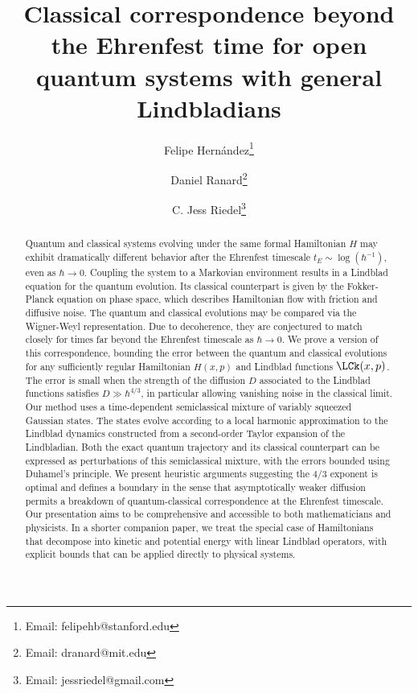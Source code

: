 \documentclass{article}
\numberwithin{equation}{section}
\begin{document}
\title{Classical correspondence beyond the Ehrenfest time for open quantum systems with general Lindbladians}







\renewcommand\Affilfont{\small}

\author[1,2]{Felipe Hernández\footnote{Email: felipehb@stanford.edu}}
\author[3]{Daniel Ranard\footnote{Email: dranard@mit.edu}}
\author[2]{C. Jess Riedel\footnote{Email: jessriedel@gmail.com}}
\date{}
\maketitle
\begin{abstract}


Quantum and classical systems evolving under the same formal Hamiltonian $H$ may exhibit dramatically different behavior after the Ehrenfest timescale  $t_E \sim \log(\hbar^{-1})$, even as $\hbar \to 0$. 
Coupling the system to a Markovian environment results in a Lindblad equation for the quantum evolution.
Its classical counterpart is given by the Fokker-Planck equation on phase space, which describes Hamiltonian flow with friction and diffusive noise. The quantum and classical evolutions may be compared via the Wigner-Weyl representation. Due to decoherence, they are conjectured to match closely for times far beyond the Ehrenfest timescale as $\hbar \to 0$. We prove a version of this correspondence, bounding the error between the quantum and classical evolutions for any sufficiently regular Hamiltonian $H(x,p)$ and Lindblad functions $\LCk(x,p)$.  The error is small when the strength of the diffusion $D$ associated to the Lindblad functions satisfies $D \gg \hbar^{4/3}$, in particular allowing vanishing noise in the classical limit. 
Our method uses a time-dependent semiclassical mixture of variably squeezed Gaussian states.  
The states evolve according to a local harmonic approximation to the Lindblad dynamics constructed from a second-order Taylor expansion of the Lindbladian.
Both the exact quantum trajectory and its classical counterpart can be expressed as perturbations of this semiclassical mixture, with the errors bounded using Duhamel's principle.
We present heuristic arguments suggesting the $4/3$ exponent is optimal and defines a boundary in the sense that asymptotically weaker diffusion permits a breakdown of quantum-classical correspondence at the Ehrenfest timescale.  Our presentation aims to be comprehensive and accessible to both mathematicians and physicists.
In a shorter companion paper, we treat the special case of Hamiltonians that decompose into kinetic and potential energy with linear Lindblad operators, with explicit bounds that can be applied directly to physical systems.
\end{abstract}
\end{document}

